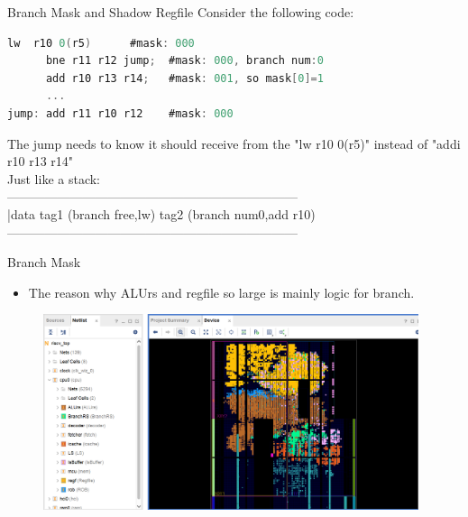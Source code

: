 \documentclass{beamer}
\begin{document}
\begin{frame}[containsverbatim]{Branch Mask and Shadow Regfile}
    Consider the following code:
    \\[3mm]
\begin{lstlisting}[language=C,basicstyle=\footnotesize\consolas]
      lw  r10 0(r5)      #mask: 000
      bne r11 r12 jump;  #mask: 000, branch num:0
      add r10 r13 r14;   #mask: 001, so mask[0]=1
      ...
jump: add r11 r10 r12    #mask: 000
\end{lstlisting}

    The jump needs to know it should receive from the "lw r10 0(r5)" instead of "addi r10 r13 r14"
    \\[3mm]
    Just like a stack: \\
    ---------------------------------------------------------------------\\
    |data tag1 (branch free,lw) tag2 (branch num0,add r10)\\
    ---------------------------------------------------------------------\\
\end{frame}

\begin{frame}{Branch Mask}
    \begin{itemize}
        \item The reason why ALUrs and regfile so large is mainly logic for branch. 
    \end{itemize}
    \begin{figure}
    \includegraphics[width=110mm]{figure.png}
    \end{figure}
\end{frame}
\end{document}
